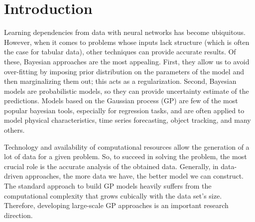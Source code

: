 \chapter{Introduction}
\label{chap:intro}







Learning dependencies from data with neural networks has become ubiquitous.
However, when it comes to problems whose inputs lack structure (which is often the case for tabular data),
other techniques can provide accurate results.
Of these, Bayesian approaches are the most appealing.
First, they allow us to avoid over-fitting by imposing
prior distribution on the parameters of the model and then marginalizing them out;
this acts as a regularization.
Second, Bayesian models are probabilistic models,
so they can provide uncertainty estimate of the predictions.
Models based on the Gaussian process (GP) are few of the most popular bayesian tools,
especially for regression tasks, and are often applied to model physical characteristics,
time series forecasting, object tracking, and many others.

Technology and availability of computational resources allow the generation of
a lot of data for a given problem.
So, to succeed in solving the problem, the most crucial role is the
accurate analysis of the obtained data.
Generally, in data-driven approaches, the more data we have, the better model
we can construct.
The standard approach to build GP models heavily suffers from the computational
complexity that grows cubically with the data set's size.
Therefore, developing large-scale GP approaches is
an important research direction.


